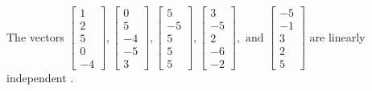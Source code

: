 \begin{exercise}
\begin{exerciseStatement}
  \end{exerciseStatement}
  \begin{exerciseAnswer}
   The vectors \(\left[\begin{array}{r}
1 \\
2 \\
5 \\
0 \\
-4
\end{array}\right] , \left[\begin{array}{r}
0 \\
5 \\
-4 \\
-5 \\
3
\end{array}\right] , \left[\begin{array}{r}
5 \\
-5 \\
5 \\
5 \\
5
\end{array}\right] , \left[\begin{array}{r}
3 \\
-5 \\
2 \\
-6 \\
-2
\end{array}\right] , \text{ and } \left[\begin{array}{r}
-5 \\
-1 \\
3 \\
2 \\
5
\end{array}\right]\) are 
  	 linearly independent  .
  


  \end{exerciseAnswer}
\end{exercise}